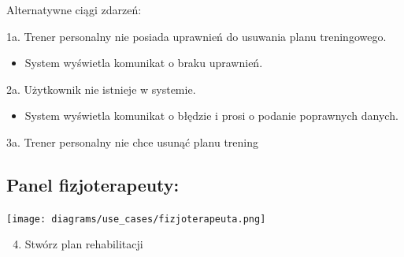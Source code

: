 \documentclass[
]{article}
\providecommand{\tightlist}{%
  \setlength{\itemsep}{0pt}\setlength{\parskip}{0pt}}
\begin{document}
{Alternatywne ciągi zdarzeń:}

{1a. Trener personalny nie posiada uprawnień do usuwania planu
treningowego.}

\begin{itemize}
\tightlist
\item
  {System wyświetla komunikat o braku uprawnień.}
\end{itemize}

{2a. Użytkownik nie istnieje w systemie.}

\begin{itemize}
\tightlist
\item
  {System wyświetla komunikat o błędzie i prosi o podanie poprawnych
  danych.}
\end{itemize}

{3a. Trener personalny nie chce usunąć planu trening}

{}

\hypertarget{h.tqqay39z8oku}{%
\subsection{\texorpdfstring{{}}{}}\label{h.tqqay39z8oku}}

{}

\hypertarget{h.vpvz4pfg93q6}{%
\subsection{\texorpdfstring{{}}{}}\label{h.vpvz4pfg93q6}}

{}

{}

{}

{}

{}

{}

{}

{}

{}

{}

\hypertarget{h.hgrtio46fsci}{%
\subsection{\texorpdfstring{{Panel
fizjoterapeuty:}}{Panel fizjoterapeuty:}}\label{h.hgrtio46fsci}}

{\texttt{[image: diagrams/use\_cases/fizjoterapeuta.png]}}

\begin{enumerate}
\setcounter{enumi}{3}
\tightlist
\item
  {Stwórz plan rehabilitacji}
\end{enumerate}
\end{document}
